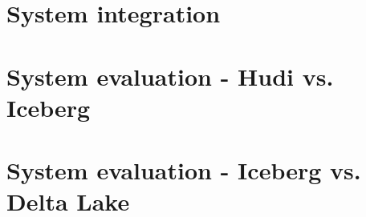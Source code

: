

\section{System integration}
  \label{sec:system_integration}
  

\section{System evaluation - Hudi vs. Iceberg}
  \label{sec:system_evaluation_hudi_iceberg}
  

\section{System evaluation - Iceberg vs. Delta Lake}
  \label{sec:system_evaluation_iceberg_delta}
  